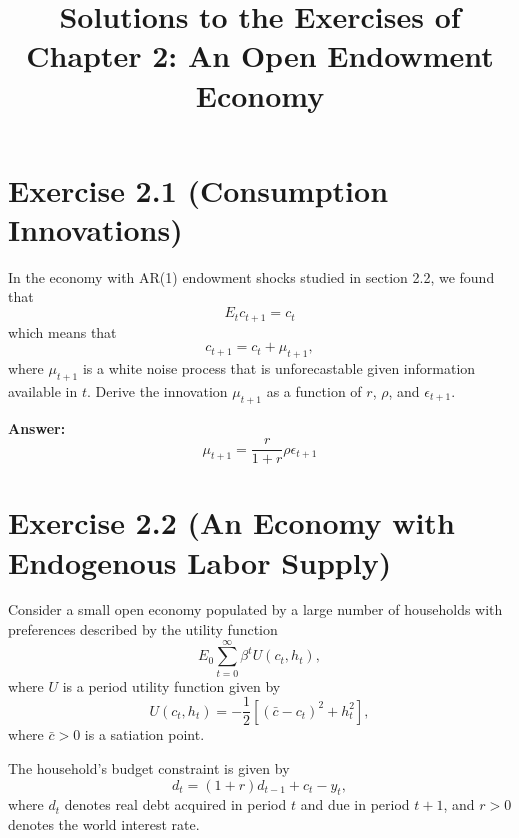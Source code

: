 \documentclass{article}
\begin{document}
\title{Solutions to the Exercises of Chapter 2: An Open Endowment Economy}
\date{}
\maketitle

\section*{Exercise 2.1 (Consumption Innovations)}
In the economy with AR(1) endowment shocks studied in section 2.2, we found that 
\[
E_t c_{t+1} = c_t
\]
which means that 
\[
c_{t+1} = c_t + \mu_{t+1},
\]
where \(\mu_{t+1}\) is a white noise process that is unforecastable given information available in \(t\). 
Derive the innovation \(\mu_{t+1}\) as a function of \(r\), \(\rho\), and \(\epsilon_{t+1}\).

\textbf{Answer:} 
\[
\mu_{t+1} = \frac{r}{1+r} \rho \epsilon_{t+1}
\]

\section*{Exercise 2.2 (An Economy with Endogenous Labor Supply)}
Consider a small open economy populated by a large number of households with preferences 
described by the utility function
\[
E_0 \sum_{t=0}^{\infty} \beta^t U(c_t, h_t),
\]
where \( U \) is a period utility function given by
\[
U(c_t, h_t) = -\frac{1}{2} \left[ (\bar{c} - c_t)^2 + h_t^2 \right],
\]
where \(\bar{c} > 0\) is a satiation point. 

The household’s budget constraint is given by
\[
d_t = (1 + r) d_{t-1} + c_t - y_t,
\]
where \( d_t \) denotes real debt acquired in period \( t \) and due in period \( t+1 \), and \( r > 0 \) denotes the world interest rate.
\end{document}
